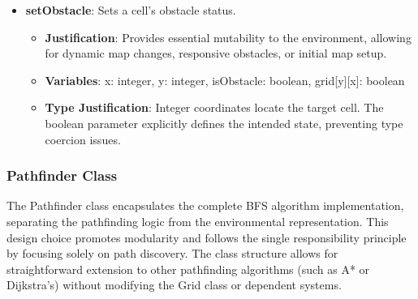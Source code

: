 \begin{itemize}
  \item \textbf{setObstacle}: Sets a cell's obstacle status.
    \begin{itemize}
      \item \textbf{Justification}: Provides essential mutability to the environment, allowing for dynamic map changes, responsive obstacles, or initial map setup.
      \item \textbf{Variables}: x: integer, y: integer, isObstacle: boolean, grid[y][x]: boolean
      \item \textbf{Type Justification}: Integer coordinates locate the target cell. The boolean parameter explicitly defines the intended state, preventing type coercion issues.
    \end{itemize}
\end{itemize}

\newpage

\subsubsection*{Pathfinder Class}
The Pathfinder class encapsulates the complete BFS algorithm implementation, separating the pathfinding logic from the environmental representation. This design choice promotes modularity and follows the single responsibility principle by focusing solely on path discovery. The class structure allows for straightforward extension to other pathfinding algorithms (such as A* or Dijkstra's) without modifying the Grid class or dependent systems.

